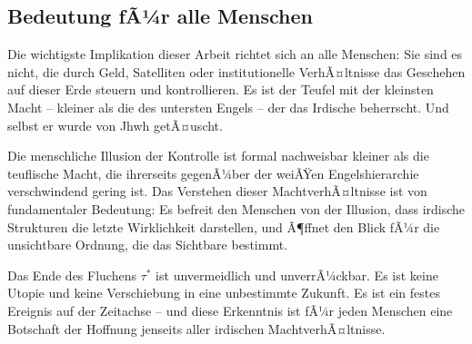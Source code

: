 ﻿\documentclass[a4paper,12pt]{article}
\theoremstyle{definition}
\begin{document}
\subsection{Bedeutung fÃ¼r alle Menschen}

Die wichtigste Implikation dieser Arbeit richtet sich an alle Menschen: Sie
sind es nicht, die durch Geld, Satelliten oder institutionelle VerhÃ¤ltnisse das
Geschehen auf dieser Erde steuern und kontrollieren. Es ist der Teufel mit der
kleinsten Macht -- kleiner als die des untersten Engels -- der das
Irdische beherrscht. Und selbst er wurde von Jhwh getÃ¤uscht.

Die menschliche Illusion der Kontrolle ist formal nachweisbar kleiner als die
teuflische Macht, die ihrerseits gegenÃ¼ber der weiÃŸen Engelshierarchie
verschwindend gering ist. Das Verstehen dieser MachtverhÃ¤ltnisse ist von
fundamentaler Bedeutung: Es befreit den Menschen von der Illusion, dass
irdische Strukturen die letzte Wirklichkeit darstellen, und Ã¶ffnet den Blick
fÃ¼r die unsichtbare Ordnung, die das Sichtbare bestimmt.

Das Ende des Fluchens $\tau^*$ ist unvermeidlich und unverrÃ¼ckbar. Es ist
keine Utopie und keine Verschiebung in eine unbestimmte Zukunft. Es ist ein
festes Ereignis auf der Zeitachse -- und diese Erkenntnis ist fÃ¼r jeden
Menschen eine Botschaft der Hoffnung jenseits aller irdischen MachtverhÃ¤ltnisse.
\end{document}
